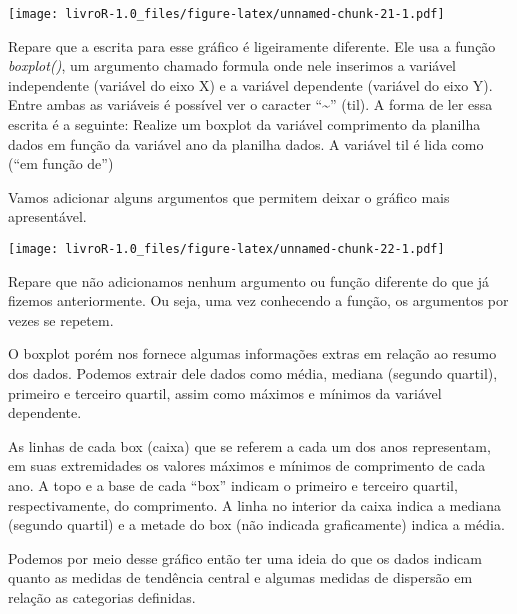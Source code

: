 \documentclass[]{book}
\newenvironment{Shaded}{\begin{snugshade}}{\end{snugshade}}
\newcommand{\DataTypeTok}[1]{\textcolor[rgb]{0.13,0.29,0.53}{#1}}
\newcommand{\KeywordTok}[1]{\textcolor[rgb]{0.13,0.29,0.53}{\textbf{#1}}}
\newcommand{\NormalTok}[1]{#1}
\newcommand{\OperatorTok}[1]{\textcolor[rgb]{0.81,0.36,0.00}{\textbf{#1}}}
\newcommand{\StringTok}[1]{\textcolor[rgb]{0.31,0.60,0.02}{#1}}
\begin{document}
\texttt{[image: livroR-1.0\_files/figure-latex/unnamed-chunk-21-1.pdf]}

Repare que a escrita para esse gráfico é ligeiramente diferente. Ele usa a função \emph{boxplot()}, um argumento chamado formula onde nele inserimos a variável independente (variável do eixo X) e a variável dependente (variável do eixo Y). Entre ambas as variáveis é possível ver o caracter ``\textasciitilde{}'' (til). A forma de ler essa escrita é a seguinte: Realize um boxplot da variável comprimento da planilha dados em função da variável ano da planilha dados. A variável til é lida como (``em função de'')

Vamos adicionar alguns argumentos que permitem deixar o gráfico mais apresentável.

\begin{Shaded}
\end{Shaded}

\texttt{[image: livroR-1.0\_files/figure-latex/unnamed-chunk-22-1.pdf]}

Repare que não adicionamos nenhum argumento ou função diferente do que já fizemos anteriormente. Ou seja, uma vez conhecendo a função, os argumentos por vezes se repetem.

O boxplot porém nos fornece algumas informações extras em relação ao resumo dos dados. Podemos extrair dele dados como média, mediana (segundo quartil), primeiro e terceiro quartil, assim como máximos e mínimos da variável dependente.

As linhas de cada box (caixa) que se referem a cada um dos anos representam, em suas extremidades os valores máximos e mínimos de comprimento de cada ano. A topo e a base de cada ``box'' indicam o primeiro e terceiro quartil, respectivamente, do comprimento. A linha no interior da caixa indica a mediana (segundo quartil) e a metade do box (não indicada graficamente) indica a média.

Podemos por meio desse gráfico então ter uma ideia do que os dados indicam quanto as medidas de tendência central e algumas medidas de dispersão em relação as categorias definidas.
\end{document}
